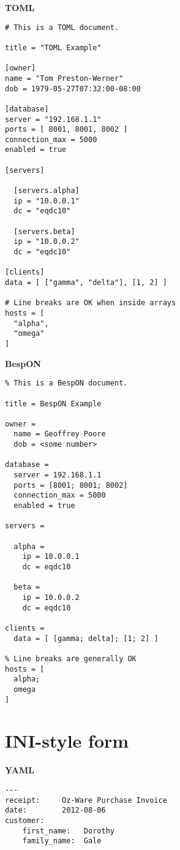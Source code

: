 \documentclass[11pt]{article}
\begin{document}
\begin{appendices}
\begin{tcolorbox}{}
\begin{multicols}{2}
\centering \textbf{TOML}
\begin{Verbatim}[formatcom=\color{DarkGreen}]
# This is a TOML document.

title = "TOML Example"

[owner]
name = "Tom Preston-Werner"
dob = 1979-05-27T07:32:00-08:00

[database]
server = "192.168.1.1"
ports = [ 8001, 8001, 8002 ]
connection_max = 5000
enabled = true

[servers]

  [servers.alpha]
  ip = "10.0.0.1"
  dc = "eqdc10"

  [servers.beta]
  ip = "10.0.0.2"
  dc = "eqdc10"

[clients]
data = [ ["gamma", "delta"], [1, 2] ]

# Line breaks are OK when inside arrays
hosts = [
  "alpha",
  "omega"
]
\end{Verbatim}
\columnbreak
\centering \textbf{BespON}

\begin{Verbatim}
% This is a BespON document.

title = BespON Example

owner =
  name = Geoffrey Poore
  dob = <some number>

database =
  server = 192.168.1.1
  ports = [8001; 8001; 8002]
  connection_max = 5000
  enabled = true

servers =

  alpha = 
    ip = 10.0.0.1
    dc = eqdc10

  beta =
    ip = 10.0.0.2
    dc = eqdc10

clients =
  data = [ [gamma; delta]; [1; 2] ]

% Line breaks are generally OK
hosts = [
  alpha;
  omega
]
\end{Verbatim}
\end{multicols}
\end{tcolorbox}



\section{INI-style form}




\begin{tcolorbox}{}
\begin{multicols}{2}

\centering \textbf{YAML}
\begin{Verbatim}[formatcom=\color{DarkGreen}]
---
receipt:     Oz-Ware Purchase Invoice
date:        2012-08-06
customer:
    first_name:   Dorothy
    family_name:  Gale


\end{Verbatim}
\end{multicols}
\end{tcolorbox}
\end{appendices}
\end{document}
